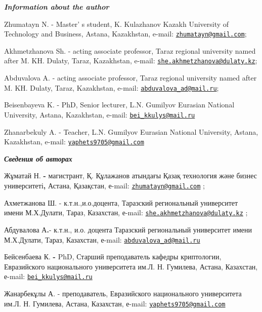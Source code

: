 \begin{authorinfo}
\emph{{\bfseries Information about the author}}

Zhumatayn N. - Master' s student, K. Kulazhanov Kazakh
University of Technology and Business, Astana, Kazakhstan, e-mail:
\href{mailto:zhumatayn@gmail.com}{\nolinkurl{zhumatayn@gmail.com}};

Akhmetzhanova Sh. - acting associate professor, Taraz regional
university named after M. KH. Dulaty, Taraz, Kazakhstan, e-mail:
\href{mailto:she.akhmetzhanova@dulaty.kz}{\nolinkurl{she.akhmetzhanova@dulaty.kz}};

Abduvalova A. - acting associate professor, Taraz regional university
named after M. KH. Dulaty, Taraz, Kazakhstan, e-mail:
\href{mailto:abduvalova_ad@mail.ru}{\nolinkurl{abduvalova\_ad@mail.ru}};

Beisenbayeva K. - PhD, Senior lecturer, L.N. Gumilyov Eurasian National
University, Astana, Kazakhstan, e-mail:
\href{mailto:bei_kkulys@mail.ru}{\nolinkurl{bei\_kkulys@mail.ru}}

Zhanarbekuly A. - Teacher, L.N. Gumilyov Eurasian National University,
Astana, Kazakhstan, e-mail:
\href{mailto:yaphets9705@gmail.com}{\nolinkurl{yaphets9705@gmail.com}}

\emph{{\bfseries Сведения об авторах}}

Жұматай Н. {\bfseries -} магистрант, Қ. Құлажанов атындағы Қазақ технология
және бизнес университеті{\bfseries ,} Астана, Қазақстан, е-mail:
\href{mailto:zhumatayn@gmail.com}{\nolinkurl{zhumatayn@gmail.com}} ;

Ахметжанова Ш. - к.т.н.,и.о.доцента, Таразский региональный университет
имени М.Х.Дулати, Тараз, Казахстан, е-mail:
\href{mailto:she.akhmetzhanova@dulaty.kz}{\nolinkurl{she.akhmetzhanova@dulaty.kz}}
;

Абдувалова А{\bfseries .}- к.т.н., и.о. доцента Таразский региональный
университет имени М.Х.Дулати, Тараз, Казахстан, е-mail:
\href{mailto:abduvalova_ad@mail.ru}{\nolinkurl{abduvalova\_ad@mail.ru}}

Бейсенбаева К. {\bfseries -} PhD, Старший преподаватель кафедры
криптологии, Евразийского национального университета им.Л. Н. Гумилева,
Астана, Казахстан, е-mail:
\href{mailto:bei_kkulys@mail.ru}{\nolinkurl{bei\_kkulys@mail.ru}}

Жанарбекұлы А. - преподаватель, Евразийского национального университета
им.Л. Н. Гумилева, Астана, Казахстан, е-mail:
\href{mailto:yaphets9705@gmail.com}{\nolinkurl{yaphets9705@gmail.com}}
\end{authorinfo}
